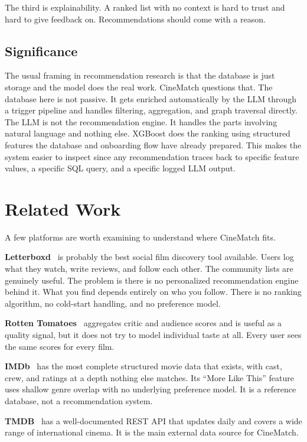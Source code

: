 \documentclass[conference]{IEEEtran}
\begin{document}
The third is explainability. A ranked list with no context is hard to trust and hard to give feedback on. Recommendations should come with a reason.

\subsection{Significance}

The usual framing in recommendation research is that the database is just storage and the model does the real work. CineMatch questions that. The database here is not passive. It gets enriched automatically by the LLM through a trigger pipeline and handles filtering, aggregation, and graph traversal directly. The LLM is not the recommendation engine. It handles the parts involving natural language and nothing else. XGBoost does the ranking using structured features the database and onboarding flow have already prepared. This makes the system easier to inspect since any recommendation traces back to specific feature values, a specific SQL query, and a specific logged LLM output.

\section{Related Work}

A few platforms are worth examining to understand where CineMatch fits.

\textbf{Letterboxd}~\cite{letterboxd} is probably the best social film discovery tool available. Users log what they watch, write reviews, and follow each other. The community lists are genuinely useful. The problem is there is no personalized recommendation engine behind it. What you find depends entirely on who you follow. There is no ranking algorithm, no cold-start handling, and no preference model.

\textbf{Rotten Tomatoes}~\cite{rottentomatoes} aggregates critic and audience scores and is useful as a quality signal, but it does not try to model individual taste at all. Every user sees the same scores for every film.

\textbf{IMDb}~\cite{imdb} has the most complete structured movie data that exists, with cast, crew, and ratings at a depth nothing else matches. Its ``More Like This'' feature uses shallow genre overlap with no underlying preference model. It is a reference database, not a recommendation system.

\textbf{TMDB}~\cite{tmdb} has a well-documented REST API that updates daily and covers a wide range of international cinema. It is the main external data source for CineMatch.
\end{document}
